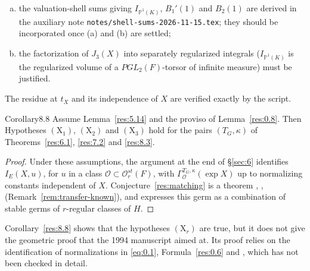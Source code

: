 \documentclass[12pt,letterpaper]{amsart}
\theoremstyle{plain}
\theoremstyle{definition}
\theoremstyle{remark}
\theoremstyle{definition}
\begin{document}
\begin{rem26}
\begin{enumerate}[(a)]
identification of $J_3$ with the $3$-regular $\kappa$-germ in
Corollary~\ref{res:8.3B} and the local constancy of Shalika germs on the
regular set;
\item the valuation-shell sums giving $I_{\mathbb{P}^1(K)}$, $B_1'(1)$ and
$B_2(1)$ are derived in the auxiliary note
\texttt{notes/}\allowbreak\texttt{shell-sums-2026-11-15.tex}; they should be
incorporated once (a) and (b) are settled;
\item the factorization of $J_3(X)$ into separately regularized integrals
($I_{\mathbb{P}^1(K)}$ is the regularized volume of a $PGL_2(F)$-torsor of
infinite measure) must be justified.
\end{enumerate}
The residue at $t_X$ and its independence of $X$ are verified exactly by
the script.
\end{rem26}

\begin{res}{Corollary}{8.8}\label{res:8.8}
Assume Lemma~\ref{res:5.14} and the proviso of Lemma~\ref{res:0.8}. Then
Hypotheses $(\mathrm X_1)$, $(\mathrm X_2)$ and $(\mathrm X_3)$ hold for the
pairs $(T_G,\kappa)$ of Theorems~\ref{res:6.1}, \ref{res:7.2} and
\ref{res:8.3}.
\end{res}

\begin{proof}
Under these assumptions, the argument at the end of \S\ref{sec:6} identifies
$I_E(X,u)$, for $u$ in a class $\mathcal O\subset\mathcal O_r^{st}(F)$, with
$\Gamma^{T_G,\kappa}_{\mathcal O}(\exp X)$ up to normalizing constants
independent of $X$. Conjecture~\ref{res:matching} is a theorem
\cite{Wa97}, \cite{Ng10}, \cite{GH16} (Remark~\ref{rem:transfer-known}), and
expresses this germ as a combination of stable germs of $r$-regular classes of
$H$.
\end{proof}

\begin{rem26}\label{rem:8.8}
Corollary~\ref{res:8.8} shows that the hypotheses $(\mathrm X_r)$ are true,
but it does not give the geometric proof that the 1994 manuscript aimed at.
Its proof relies on the identification of normalizations in \eqref{eq:0.1},
Formula~\ref{res:0.6} and \cite{GH16}, which has not been checked in detail.
\end{rem26}
\label{sec:9}
\end{document}
